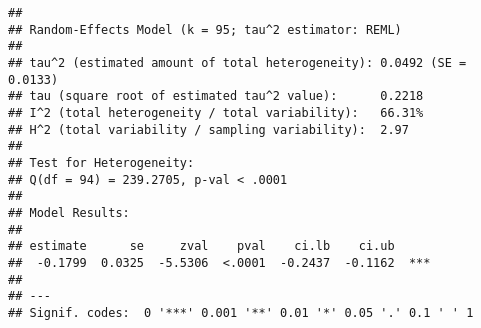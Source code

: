 \documentclass[
]{book}
\newenvironment{Shaded}{\begin{snugshade}}{\end{snugshade}}
\newcommand{\AttributeTok}[1]{\textcolor[rgb]{0.77,0.63,0.00}{#1}}
\newcommand{\CommentTok}[1]{\textcolor[rgb]{0.56,0.35,0.01}{\textit{#1}}}
\newcommand{\DecValTok}[1]{\textcolor[rgb]{0.00,0.00,0.81}{#1}}
\newcommand{\DocumentationTok}[1]{\textcolor[rgb]{0.56,0.35,0.01}{\textbf{\textit{#1}}}}
\newcommand{\FunctionTok}[1]{\textcolor[rgb]{0.00,0.00,0.00}{#1}}
\newcommand{\NormalTok}[1]{#1}
\newcommand{\OtherTok}[1]{\textcolor[rgb]{0.56,0.35,0.01}{#1}}
\newcommand{\SpecialCharTok}[1]{\textcolor[rgb]{0.00,0.00,0.00}{#1}}
\begin{document}
\begin{Shaded}
\end{Shaded}

\begin{verbatim}
## 
## Random-Effects Model (k = 95; tau^2 estimator: REML)
## 
## tau^2 (estimated amount of total heterogeneity): 0.0492 (SE = 0.0133)
## tau (square root of estimated tau^2 value):      0.2218
## I^2 (total heterogeneity / total variability):   66.31%
## H^2 (total variability / sampling variability):  2.97
## 
## Test for Heterogeneity:
## Q(df = 94) = 239.2705, p-val < .0001
## 
## Model Results:
## 
## estimate      se     zval    pval    ci.lb    ci.ub      
##  -0.1799  0.0325  -5.5306  <.0001  -0.2437  -0.1162  *** 
## 
## ---
## Signif. codes:  0 '***' 0.001 '**' 0.01 '*' 0.05 '.' 0.1 ' ' 1
\end{verbatim}
\end{document}
